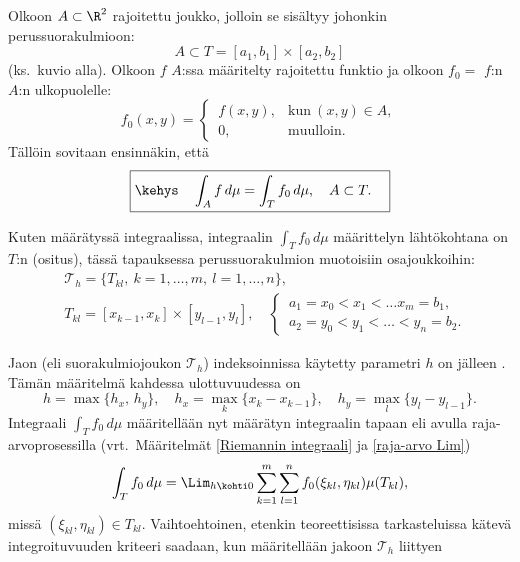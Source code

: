 Olkoon $A\subset\R^2$ rajoitettu joukko, jolloin se sisältyy johonkin perussuorakulmioon:
\[
A \subset T = [a_1,b_1]\times [a_2,b_2]
\]
(ks.\ kuvio alla). Olkoon $f$ $A$:ssa määritelty rajoitettu funktio ja olkoon $f_0=$ $f$:n
%
 $A$:n ulkopuolelle:
\[
f_0(x,y)=\begin{cases} \,f(x,y), &\text{kun}\ (x,y)\in A, \\ \,0, &\text{muulloin}. \end{cases}
\]
Tällöin sovitaan ensinnäkin, että
\[
\boxed{\kehys\quad \int_A f\, d\mu=\int_T f_0\, d\mu, \quad A \subset T. \quad}
\]
\begin{figure}[H]
\begin{center}

\end{center}
\end{figure}
Kuten määrätyssä integraalissa, integraalin $\int_T f_0\,d\mu$ määrittelyn lähtökohtana on
%
$T$:n  (ositus), tässä tapauksessa perussuorakulmion muotoisiin osajoukkoihin:
\begin{align*}
&\mathcal{T}_h=\{T_{kl}, \ k=1,\ldots, m, \ l=1,\ldots, n\}, \\[1mm]
&T_{kl} = [x_{k-1},x_k]\times [y_{l-1},y_l], \quad
\begin{cases} \,a_1 = x_0<x_1<\ldots x_m=b_1, \\ \,a_2 = y_0<y_1<\ldots < y_n=b_2. \end{cases}
\end{align*}
\begin{figure}[H]
\begin{center}

\end{center}
\end{figure}
Jaon (eli suorakulmiojoukon $\mathcal{T}_h$) indeksoinnissa käytetty parametri $h$ on jälleen
%
. Tämän määritelmä kahdessa ulottuvuudessa on
\[
h=\max\{h_x,\,h_y\}, \quad h_x=\max_k\{x_k-x_{k-1}\}, \quad h_y=\max_l\{y_l-y_{l-1}\}.
\]
Integraali $\int_T f_0\,d\mu$ määritellään nyt määrätyn integraalin tapaan eli
%
 avulla raja-arvoprosessilla
(vrt.\ Määritelmät \ref{Riemannin integraali} ja \ref{raja-arvo Lim})
\[
\int_T f_0\,d\mu = \Lim_{h\kohti 0} \sum_{k=1}^m \sum_{l=1}^n f_0(\xi_{kl},\eta_{kl})\mu(T_{kl}),
\]
missä $(\xi_{kl},\eta_{kl})\in T_{kl}$. Vaihtoehtoinen, etenkin teoreettisissa tarkasteluissa
kätevä integroituvuuden kriteeri saadaan, kun määritellään jakoon $\mathcal{T}_h$ liittyen

